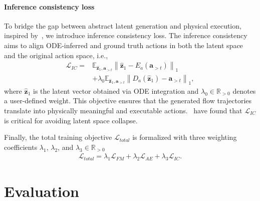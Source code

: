 \documentclass[onecolumn]{fairmeta}
\begin{document}
	\paragraph{Inference consistency loss} To bridge the gap between abstract latent generation and physical execution, inspired by~\citet{gao2025vita}, we introduce inference consistency loss. The inference consistency aims to align ODE-inferred and ground truth actions in both the latent space and the original action space, i.e.,
	\begin{equation}
		\begin{aligned} \label{loss_IC}
			\mathcal{L}_{IC} =  & \mathbb{E}_{\hat{\mathbf{z}}_1, \mathbf{a}_{> t}} \left\| \hat{\mathbf{z}}_1 - E_a(\mathbf{a}_{> t}) \right\|_1\\  & + \lambda_0\mathbb{E}_{\hat{\mathbf{z}}_1, \mathbf{a}_{> t}} \left\| D_a(\hat{\mathbf{z}}_1) - \mathbf{a}_{> t} \right\|_1 ,
		\end{aligned}
	\end{equation}
	where $\hat{\mathbf{z}}_1$ is the latent vector obtained via ODE integration and $\lambda_0\in \mathbb{R}_{>0}$ denotes a user-defined weight. This objective ensures that the generated flow trajectories translate into physically meaningful and executable actions.~\citet{gao2025vita} have found that $\mathcal{L}_{IC}$ is critical for avoiding latent space collapse.
	
	Finally, the total training objective $\mathcal{L}_{total}$ is formalized with three weighting coefficients $\lambda_1$, $\lambda_2$, and $\lambda_3 \in \mathbb{R}_{>0}$
	\begin{equation}
		\begin{aligned}
			\mathcal{L}_{total} = \lambda_1\mathcal{L}_{FM} + \lambda_2\mathcal{L}_{AE} + \lambda_3\mathcal{L}_{IC}.
		\end{aligned}
	\end{equation}
	
	\section{Evaluation}
	
\end{document}
